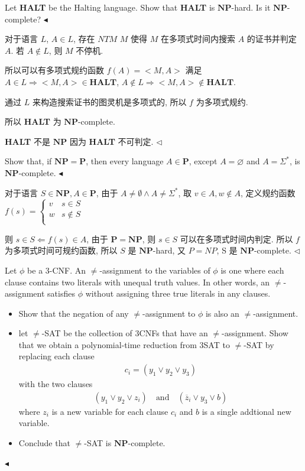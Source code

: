 \documentclass[11pt]{article}
\newcommand{\mP}{\mathbf{P}}
\newcommand{\NP}{\mathbf{NP}}
\newenvironment{problem}[2][Problem]{\begin{trivlist}
		\item[\hskip \labelsep {\bfseries #1}\hskip \labelsep {\bfseries #2.}]}{\hfill$\blacktriangleleft$\end{trivlist}}
\newenvironment{answer}[1][Answer]{\begin{trivlist}
		\item[\hskip \labelsep {\bfseries #1.}\hskip \labelsep]}{\hfill$\lhd$\end{trivlist}}
\begin{document}
	\begin{problem}{4.(14 points)}
		Let \textbf{HALT} be the Halting language. Show that \textbf{HALT} is $\NP$-hard. Is it $\NP$-complete? 
	\end{problem}
	\begin{answer}
		对于语言 $L$, $A\in L$, 存在 $NTM$ $M$ 使得 $M$ 在多项式时间内搜索 $A$ 的证书并判定 $A$. 若 $A\notin L$, 则 $M$ 不停机.
		
		所以可以有多项式规约函数 $f(A)=<M,A>$ 满足 $A\in L\Rightarrow <M,A>\in \textbf{HALT}$, $A\notin L\Rightarrow <M,A>\notin \textbf{HALT}$.
		
		通过 $L$ 来构造搜索证书的图灵机是多项式的, 所以 $f$ 为多项式规约.
		
		所以 \textbf{HALT} 为 $\NP$-complete.
		
		\textbf{HALT} 不是 $\NP$ 因为 \textbf{HALT} 不可判定.
	\end{answer}
	\begin{problem}{5.(14 points)}
		Show that, if $\NP = \mP$, then every language $A \in \mP$, except $A = \varnothing$ and $A = \Sigma^*$, is $\NP$-complete.
	\end{problem}
	\begin{answer}
		对于语言 $S\in\NP,A\in\mP$, 由于 $A\neq\emptyset \wedge A\neq \Sigma^*$, 取 $v\in A,w\notin A$, 定义规约函数 $f(s)=\begin{cases}
			v & s\in S \\
			w & s\notin S \\
		\end{cases}$
		
		则 $s\in S\Leftarrow f(s)\in A$, 由于 $\mP=\NP$, 则 $s\in S$ 可以在多项式时间内判定. 所以 $f$ 为多项式时间可规约函数, 所以 $S$ 是 $\NP$-hard, 又 $P=NP$, S 是 $\NP$-complete.
	\end{answer}
	\begin{problem}{6.(28 points)}
		Let $\phi$ be a 3-CNF. An $\neq$-assignment to the variables of $\phi$ is one where each clause contains two literals with unequal truth values. In other words, an $\neq$-assignment satisfies $\phi$ without assigning three true literals in any clauses.
		\begin{itemize}
			\item Show that the negation of any $\neq$-assignment to $\phi$ is also an $\neq$-assignment.
			\item let $\neq$-SAT be the collection of 3CNFs that have an $\neq$-assignment. Show that we obtain a polynomial-time reduction from 3SAT to $\neq$-SAT by replacing each clause 
			\begin{align*}
				c_i = (y_1 \lor y_2 \lor y_3)
			\end{align*}
			with the two clauses
			\begin{align*}
				(y_1 \lor y_2 \lor z_i) \quad \text{and} \quad (\overline{z}_i \lor y_3 \lor b)
			\end{align*}
			where $z_i$ is a new variable for each clause $c_i$ and $b$ is a single addtional new variable.
			\item Conclude that $\neq$-SAT is $\NP$-complete. 
		\end{itemize}
	\end{problem}
\end{document}
